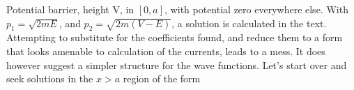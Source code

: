 %
%
%
%

Potential barrier, height V, in $[0,a]$, with potential zero everywhere else.  With $p_1 = \sqrt{2mE}$, and $p_2 = \sqrt{2m(V-E)}$, a
solution is calculated in the text.  Attempting to substitute for the coefficients found, and reduce them to a form
that looks amenable to calculation of the currents, leads to a mess.  It does however suggest a simpler structure for the 
wave functions.  Let's start over and seek solutions in the $x>a$ region of the form

